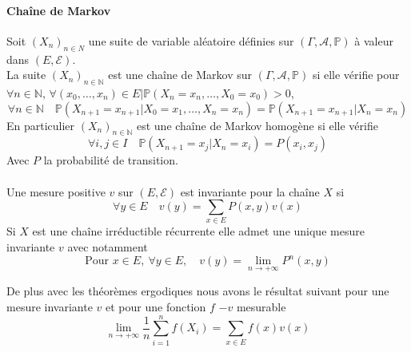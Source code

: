 \documentclass{article}
\theoremstyle{definition}
\theoremstyle{remark}
\begin{document}
\paragraph{Chaîne de Markov \\}

Soit $(X_n)_{n \in \mathbb{}{N}}$ une suite de variable aléatoire définies sur $(\Gamma , \mathcal{A}, \mathbb{P})$ à valeur dans 
$(E, \mathcal{E})$. \\

La suite $(X_n)_{n \in \mathbb{N}}$ est une chaîne de Markov sur $(\Gamma, \mathcal{A}, \mathbb{P})$ si elle vérifie pour 
$\forall n \in \mathbb{N}$, $\forall (x_0, \ldots, x_n) \in E | \mathbb{P}(X_n = x_n, \ldots, X_0 = x_0) > 0$,
\[
	\forall n \in \mathbb{N} \quad \mathbb{P}(X_{n+1}  = x_{n+1} | X_0 = x_1, \ldots, X_n = x_n) = 
	\mathbb{P}(X_{n+1} = x_{n+1}| X_n = x_n)
\]
En particulier $(X_n)_{n \in \mathbb{N}}$ est une chaîne de Markov homogène si elle vérifie 
\[
	\forall i,j \in I \quad \mathbb{P}(X_{n+1}  = x_{j}| X_n = x_i) = P(x_i,x_{j})
\]
Avec $P$ la probabilité de transition.
\paragraph{}
Une mesure positive $v$ sur $(E,\mathcal{E})$ est invariante pour la chaîne $X$ si
\[
	\forall y \in E  \quad v(y) = \sum_{x \in E} P(x,y) v(x)
\]
Si $X$ est une chaîne irréductible récurrente elle admet une unique mesure invariante $v$ avec notamment 
$$ \text{Pour }x \in E, \ \forall y \in E, \quad v(y) = \lim _{n \rightarrow+\infty} P^n
(x,y) $$

De plus avec les théorèmes ergodiques nous avons le résultat suivant pour une mesure invariante $v$ et pour une fonction $f$ $-v$ mesurable 
\begin{equation}
	\lim _{n \rightarrow+\infty} \frac{1}{n} \sum_{i=1}^{n} f\left(X_i\right)=\sum_{x \in E}{f(x) v(x)} 
	\end{equation}
 
\end{document}
